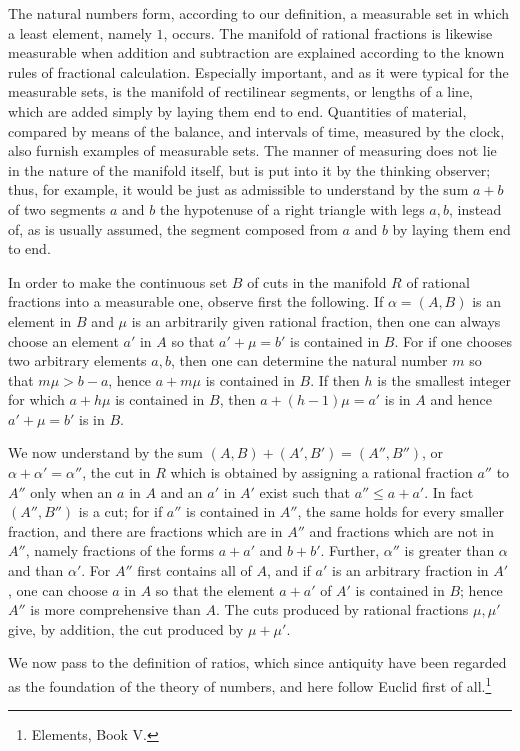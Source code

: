\documentclass[11pt]{article}
\begin{document}
The natural numbers form, according to our definition, a measurable set in which a least element, namely $1$, occurs. The manifold of rational fractions is likewise measurable when addition and subtraction are explained according to the known rules of fractional calculation. Especially important, and as it were typical for the measurable sets, is the manifold of rectilinear segments, or lengths of a line, which are added simply by laying them end to end. Quantities of material, compared by means of the balance, and intervals of time, measured by the clock, also furnish examples of measurable sets. The manner of measuring does not lie in the nature of the manifold itself, but is put into it by the thinking observer; thus, for example, it would be just as admissible to understand by the sum $a+b$ of two segments $a$ and $b$ the hypotenuse of a right triangle with legs $a,b$, instead of, as is usually assumed, the segment composed from $a$ and $b$ by laying them end to end.

In order to make the continuous set $B$ of cuts in the manifold $R$ of rational fractions into a measurable one, observe first the following. If $\alpha=(A,B)$ is an element in $B$ and $\mu$ is an arbitrarily given rational fraction, then one can always choose an element $a'$ in $A$ so that $a'+\mu=b'$ is contained in $B$. For if one chooses two arbitrary elements $a,b$, then one can determine the natural number $m$ so that $m\mu>b-a$, hence $a+m\mu$ is contained in $B$. If then $h$ is the smallest integer for which $a+h\mu$ is contained in $B$, then $a+(h-1)\mu=a'$ is in $A$ and hence $a'+\mu=b'$ is in $B$.

We now understand by the sum $(A,B)+(A',B')=(A'',B'')$, or $\alpha+\alpha'=\alpha''$, the cut in $R$ which is obtained by assigning a rational fraction $a''$ to $A''$ only when an $a$ in $A$ and an $a'$ in $A'$ exist such that $a''\le a+a'$. In fact $(A'',B'')$ is a cut; for if $a''$ is contained in $A''$, the same holds for every smaller fraction, and there are fractions which are in $A''$ and fractions which are not in $A''$, namely fractions of the forms $a+a'$ and $b+b'$. Further, $\alpha''$ is greater than $\alpha$ and than $\alpha'$. For $A''$ first contains all of $A$, and if $a'$ is an arbitrary fraction in $A'$, one can choose $a$ in $A$ so that the element $a+a'$ of $A'$ is contained in $B$; hence $A''$ is more comprehensive than $A$. The cuts produced by rational fractions $\mu,\mu'$ give, by addition, the cut produced by $\mu+\mu'$.

We now pass to the definition of ratios, which since antiquity have been regarded as the foundation of the theory of numbers, and here follow Euclid first of all.\footnote{Elements, Book V.}
\end{document}
